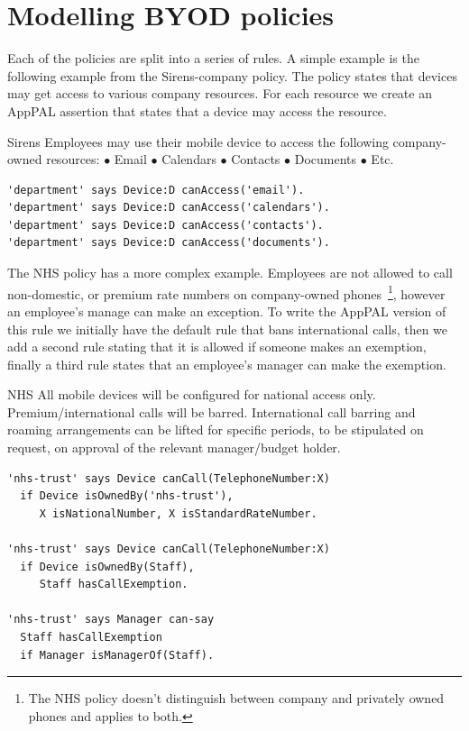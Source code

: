 \documentclass[thesis.tex]{subfiles}
\begin{document}
\section{Modelling BYOD policies}

Each of the policies are split into a series of rules. A simple example is the
following example from the Sirens-company policy. The policy states that devices
may get access to various company resources. For each resource we create an AppPAL
assertion that states that a device may access the resource.

\begin{policyrule}{Sirens}
  Employees may use their mobile device to access the following company-owned resources:
  \newline $\bullet$ Email $\bullet$ Calendars $\bullet$ Contacts $\bullet$ Documents $\bullet$ Etc.
  \normalfont
  \begin{lstlisting}
'department' says Device:D canAccess('email').
'department' says Device:D canAccess('calendars').
'department' says Device:D canAccess('contacts').
'department' says Device:D canAccess('documents').
  \end{lstlisting}
\end{policyrule}

The NHS policy has a more complex example. Employees are not
allowed to call non-domestic, or premium rate numbers on company-owned
phones~\footnote{The NHS policy doesn't distinguish between company and
privately owned phones and applies to both.}, however an employee's manage can make an exception.
To write the AppPAL version of this rule we initially have the default
rule that bans international calls, then we add a second rule stating that it is
allowed if someone makes an exemption, finally a third rule states that an employee's manager 
can make the exemption.

\begin{policyrule}{NHS}
  All mobile devices will be configured for national access only. Premium/international calls will be barred.
  International call barring and roaming arrangements can be lifted for specific periods, to be stipulated on request, on approval of the relevant manager/budget holder.
  \normalfont
  \begin{lstlisting}
'nhs-trust' says Device canCall(TelephoneNumber:X)
  if Device isOwnedBy('nhs-trust'),
     X isNationalNumber, X isStandardRateNumber.

'nhs-trust' says Device canCall(TelephoneNumber:X)
  if Device isOwnedBy(Staff),
     Staff hasCallExemption.

'nhs-trust' says Manager can-say
  Staff hasCallExemption
  if Manager isManagerOf(Staff).
  \end{lstlisting}
\end{policyrule}
\end{document}
